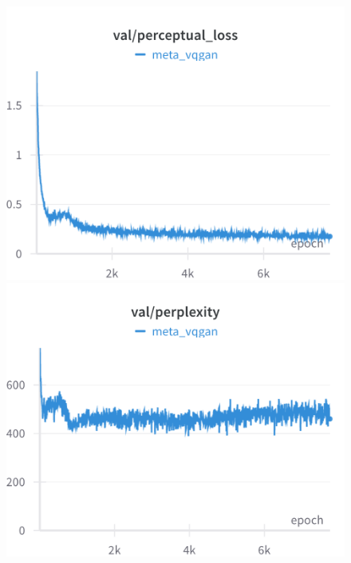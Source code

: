 \begin{figure}[H]
\includegraphics[width=\linewidth]{detailed_engineering/Meta VQGAN/charts/Section-4-Panel-0-9utd8c9z0}
\caption{}
\endminipage\hfill
{}
\includegraphics[width=\linewidth]{detailed_engineering/Meta VQGAN/charts/Section-4-Panel-1-njiwngfn7}
\caption{}
\endminipage
\end{figure}

